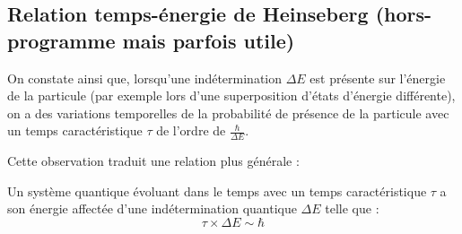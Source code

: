 \documentclass[11pt,fleqn]{book} %
\begin{document}
\subsection{Relation temps-énergie de Heinseberg (hors-programme mais parfois utile)}

On constate ainsi que, lorsqu'une indétermination $\Delta E$ est présente sur l'énergie de la particule (par exemple lors d'une superposition d'états d'énergie différente), on a des variations temporelles de la probabilité de présence de la particule avec un temps caractéristique $\tau$ de l'ordre de $\frac{\hbar}{\Delta E}$.

Cette observation traduit une relation plus générale :
\begin{proposition}
	Un système quantique évoluant dans le temps avec un temps caractéristique $\tau$ a son énergie affectée d'une indétermination quantique $\Delta E$ telle que :
	\begin{equation}
		\tau \times \Delta E \sim \hbar
	\end{equation}
\end{proposition}
\end{document}
